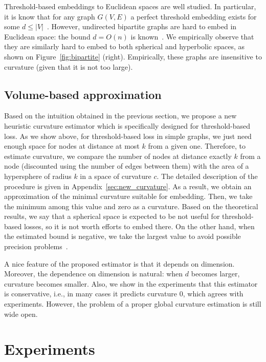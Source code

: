 \documentclass{article} %
\begin{document}
Threshold-based embeddings to Euclidean spaces are well studied. In particular, it is know that for any graph $G(V,E)$ a perfect threshold embedding  exists for some $d \le |V|$~\citep{maehara1984space}. 
However, undirected bipartite graphs are hard to embed in Euclidean space: the bound $d = O(n)$ is known~\citep{maehara1984space}. We empirically observe that they are similarly hard to embed to both spherical and hyperbolic spaces, as shown on Figure~\ref{fig:bipartite} (right). Empirically, these graphs are insensitive to curvature (given that it is not too large).
 
\subsection{Volume-based approximation}

Based on the intuition obtained in the previous section, we propose a new heuristic curvature estimator which is specifically designed for threshold-based loss. As we show above, for threshold-based loss in simple graphs, we just need enough space for nodes at distance at most $k$ from a given one. Therefore, to estimate curvature, we compare the number of nodes at distance exactly $k$ from a node (discounted using the number of edges between them) with the area of a hypersphere of radius $k$ in a space of curvature $c$. The detailed description of the procedure is given in Appendix~\ref{sec:new_curvature}. As a result, we obtain an approximation of the minimal curvature suitable for embedding.  Then, we take the minimum among this value and zero as a curvature. Based on the theoretical results, we say that a spherical space is expected to be not useful for threshold-based losses, so it is not worth efforts to embed there. On the other hand, when the estimated bound is negative, we take the largest value to avoid possible precision problems~\cite{sala2018representation}.

A nice feature of the proposed estimator is that it depends on dimension. Moreover, the dependence on dimension is natural: when $d$ becomes larger, curvature becomes smaller. Also, we show in the experiments that this estimator is conservative, i.e., in many cases it predicts curvature 0, which agrees with experiments. However, the problem of a proper global curvature estimation is still wide open.
 
\section{Experiments}\label{sec:experiments}
\end{document}
